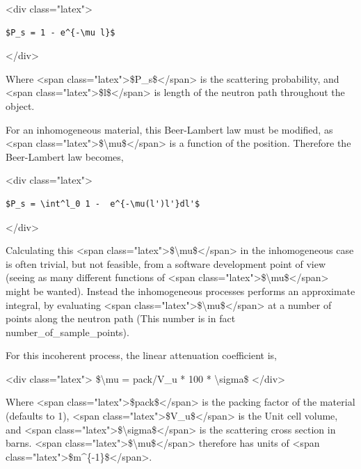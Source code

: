 \textless{}div class="latex"\textgreater{}

\begin{verbatim}
$P_s = 1 - e^{-\mu l}$
\end{verbatim}

\textless{}/div\textgreater{}

Where \textless{}span class="latex"\textgreater{}\$P\_s\$\textless{}/span\textgreater{} is the scattering probability, and \textless{}span class="latex"\textgreater{}\$l\$\textless{}/span\textgreater{} is length of the neutron path throughout the object.

For an inhomogeneous material, this Beer-Lambert law must be modified, as \textless{}span class="latex"\textgreater{}\$\textbackslash{}mu\$\textless{}/span\textgreater{} is a function of the position. Therefore the Beer-Lambert law becomes,

\textless{}div class="latex"\textgreater{}

\begin{verbatim}
$P_s = \int^l_0 1 -  e^{-\mu(l')l'}dl'$
\end{verbatim}

\textless{}/div\textgreater{}

Calculating this \textless{}span class="latex"\textgreater{}\$\textbackslash{}mu\$\textless{}/span\textgreater{} in the inhomogeneous case is often trivial, but not feasible, from a software development point of view (seeing as many different functions of \textless{}span class="latex"\textgreater{}\$\textbackslash{}mu\$\textless{}/span\textgreater{} might be wanted). Instead the inhomogeneous processes performs an approximate integral, by evaluating \textless{}span class="latex"\textgreater{}\$\textbackslash{}mu\$\textless{}/span\textgreater{} at a number of points along the neutron path (This number is in fact number\_of\_sample\_points).

For this incoherent process, the linear attenuation coefficient is,

\textless{}div class="latex"\textgreater{} \$\textbackslash{}mu = pack/V\_u * 100 * \textbackslash{}sigma\$ \textless{}/div\textgreater{}

Where \textless{}span class="latex"\textgreater{}\$pack\$\textless{}/span\textgreater{} is the packing factor of the material (defaults to 1), \textless{}span class="latex"\textgreater{}\$V\_u\$\textless{}/span\textgreater{} is the Unit cell volume, and \textless{}span class="latex"\textgreater{}\$\textbackslash{}sigma\$\textless{}/span\textgreater{} is the scattering cross section in barns. \textless{}span class="latex"\textgreater{}\$\textbackslash{}mu\$\textless{}/span\textgreater{} therefore has units of \textless{}span class="latex"\textgreater{}\$m\textasciicircum{}\{-1\}\$\textless{}/span\textgreater{}.

